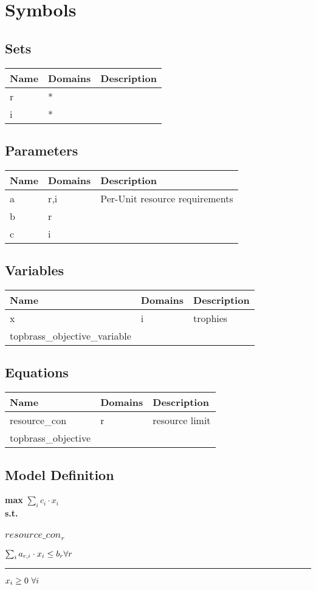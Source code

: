 \documentclass[11pt]{article}
\begin{document}
\section*{Symbols}


\subsection*{Sets}
\begin{tabularx}{\textwidth}{| l | l | X |}
\hline
\textbf{Name} & \textbf{Domains} & \textbf{Description}\\
\hline
\endhead

r & * & \\
i & * & \\
\hline
\end{tabularx}
\subsection*{Parameters}
\begin{tabularx}{\textwidth}{| l | l | X |}
\hline
\textbf{Name} & \textbf{Domains} & \textbf{Description}\\
\hline
\endhead

a & r,i & Per-Unit resource requirements\\
b & r & \\
c & i & \\
\hline
\end{tabularx}
\subsection*{Variables}
\begin{tabularx}{\textwidth}{| l | l | X |}
\hline
\textbf{Name} & \textbf{Domains} & \textbf{Description}\\
\hline
\endhead

x & i & trophies\\
topbrass\_objective\_variable &  & \\
\hline
\end{tabularx}
\subsection*{Equations}
\begin{tabularx}{\textwidth}{| l | l | X |}
\hline
\textbf{Name} & \textbf{Domains} & \textbf{Description}\\
\hline
\endhead

resource\_con & r & resource limit\\
topbrass\_objective &  & \\
\hline
\end{tabularx}
\subsection*{Model Definition}
\textbf{max} $\sum_{i} c_{i} \cdot x_{i}$\\
\textbf{s.t.}
\subsubsection*{$resource\_con_{r}$}
$
\sum_{i} a_{r,i} \cdot x_{i} \leq b_{r}\hfill \forall r
$
\vspace{5pt}
\hrule
\bigskip
$x_{i}\geq 0 ~ \forall i\\$
\end{document}
